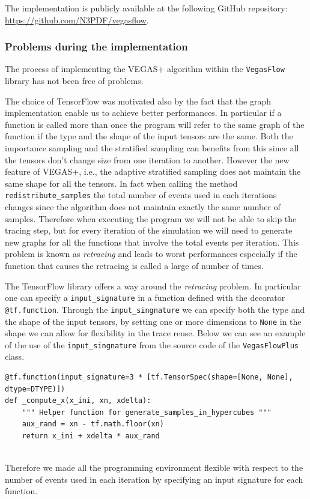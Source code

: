 \documentclass[../main/main.tex]{subfiles}
\begin{document}
The implementation is publicly available at the following GitHub repository: \url{https://github.com/N3PDF/vegasflow}.
\subsubsection{Problems during the implementation}
\label{vfp problem}
The process of implementing the VEGAS+ algorithm within the \texttt{VegasFlow} library has not been free of problems.

The choice of TensorFlow was motivated also by the fact that the graph implementation enable us to achieve better performances. In particular if a function is called more than once the program will refer to the same graph of the function if the type and the shape of the input tensors are the same.
Both the importance sampling and the stratified sampling can benefits from this since all the tensors don't change size from one iteration to another. However the new feature of VEGAS+, i.e., the adaptive stratified sampling does not maintain the same shape for all the tensors.
In fact when calling the method \texttt{redistribute\_samples} the total number of events used in each iterations changes since the algorithm does not maintain exactly the same number of samples.
Therefore when executing the program we will not be able to skip the tracing step, but for every iteration of the simulation we will  need to generate new graphs for all the functions that involve the total events per iteration. This problem is known as \emph{retracing} and leads to worst performances especially if the function that causes the retracing is called a large of number of times.

The TensorFlow library offers a way around the \emph{retracing} problem.
In particular one can specify a \texttt{input\_signature} in a function defined with the decorator \texttt{@tf.function}.
Through the \texttt{input\_singnature} we can specify both the type and the shape of the input tensors, by setting one or more dimensions to \texttt{None} in the shape we can allow for flexibility in the trace reuse. Below we can see an example of the use of the \texttt{input\_singnature} from the source code of the \texttt{VegasFlowPlus} class.
\begin{verbatim}
@tf.function(input_signature=3 * [tf.TensorSpec(shape=[None, None], dtype=DTYPE)])
def _compute_x(x_ini, xn, xdelta):
	""" Helper function for generate_samples_in_hypercubes """
	aux_rand = xn - tf.math.floor(xn)
	return x_ini + xdelta * aux_rand
	
\end{verbatim}
Therefore we made all the programming environment flexible with respect to the number of events used in each iteration by specifying an input signature for each function.
\end{document}
